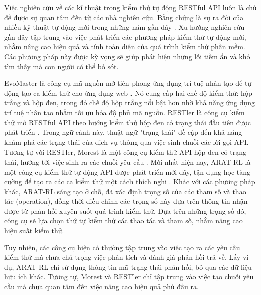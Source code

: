 Việc nghiên cứu về các kĩ thuật trong kiểm thử tự động RESTful API luôn là chủ đề được sự quan tâm đến từ các nhà nghiên cứu. Bằng chứng là sự ra đời của nhiều kỹ thuật tự động mới trong những năm gần đây \cite{app12094369}. Xu hướng nghiên cứu gần đây tập trung vào việc phát triển các phương pháp kiểm thử tự động mới, nhằm nâng cao hiệu quả và tính toàn diện của quá trình kiểm thử phần mềm. Các phương pháp này được kỳ vọng sẽ giúp phát hiện những lỗi tiềm ẩn và khó tìm thấy mà con người có thể bỏ sót.

EvoMaster là công cụ mã nguồn mở tiên phong ứng dụng trí tuệ nhân tạo để tự động tạo ca kiểm thứ cho ứng dụng web \cite{arcuri2019restful}. Nó cung cấp hai chế độ kiểm thử: hộp trắng và hộp đen, trong đó chế độ hộp trắng nổi bật hơn nhờ khả năng ứng dụng trí tuệ nhân tạo nhằm tối ưu hóa độ phủ mã nguồn. RESTler là công cụ kiểm thử mờ RESTful API theo hướng kiểm thử hộp đen có trạng thái đầu tiên được phát triển
\cite{atlidakis2019restler}. Trong ngữ cảnh này, thuật ngữ "trạng thái" đề cập đến khả năng khám phá
các trạng thái của dịch vụ thông qua việc sinh chuỗi các lời gọi API. Tương tự với RESTler, Morest là một công cụ kiểm thử API hộp đen có trạng thái, hướng tới việc sinh ra các chuỗi yêu cầu \cite{liu2022morest}. Mới nhất hiện nay, ARAT-RL là một công cụ kiểm thử tự động API được phát triển mới đây, tận dụng học
tăng cường để tạo ra các ca kiểm thử một cách thích nghi \cite{kim2023adaptive}. Khác với các
phương pháp khác, ARAT-RL sáng tạo ở chỗ, đã xác định trọng số của các tham
số và thao tác (operation), đồng thời điều chỉnh các trọng số này dựa trên thông
tin nhận được từ phản hồi xuyên suốt quá trình kiểm thử. Dựa trên những trọng
số đó, công cụ sẽ lựa chọn thứ tự kiểm thử các thao tác và tham
số, nhằm nâng cao hiệu suất kiểm thử.

Tuy nhiên, các công cụ hiện có thường tập trung vào việc tạo ra các yêu cầu kiểm thử mà chưa chú trọng việc phân tích và đánh giá phản hồi trả về. Lấy ví dụ, ARAT-RL chỉ sử dụng thông tin mã trạng thái phản hồi, bỏ qua các dữ liệu hữu ích khác. Tương tự, Morest và RESTler chỉ tập trung vào việc tạo chuỗi yêu cầu mà chưa quan tâm đến việc nâng cao hiệu quả phủ đầu ra.